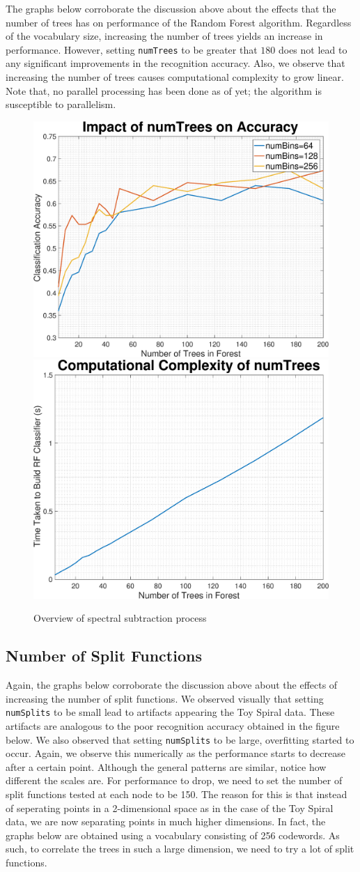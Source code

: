 \documentclass[a4paper,pra,twocolumn,10pt,aps,longbibliography,nobalancelastpage]{revtex4-1}
\begin{document}
The graphs below corroborate the discussion above about the effects that the number of trees has on performance of the Random Forest algorithm. Regardless of the vocabulary size, increasing the number of trees yields an increase in performance. However, setting  \texttt{numTrees} to be greater that $180$ does not lead to any significant improvements in the recognition accuracy. Also, we observe that increasing the number of trees causes computational complexity to grow linear. Note that, no parallel processing has been done as of yet; the algorithm is susceptible to parallelism. 

\begin{figure}[H]
	\centering
    \includegraphics[width=0.49\columnwidth]{numTrees_acc}
	\includegraphics[width=0.49\columnwidth]{numTrees_complexity}
    \caption{Overview of spectral subtraction process}
    \label{fig:numtrees_caltech}
\end{figure}

\subsection*{Number of Split Functions}

Again, the graphs below corroborate the discussion above about the effects of increasing the number of split functions. We observed visually that setting \texttt{numSplits} to be small lead to artifacts appearing the Toy Spiral data. These artifacts are analogous to the poor recognition accuracy obtained in the figure below. We also observed that setting \texttt{numSplits} to be large, overfitting started to occur. Again, we observe this numerically as the performance starts to decrease after a certain point. Although the general patterns are similar, notice how different the scales are. For performance to drop, we need to set the number of split functions tested at each node to be 150. The reason for this is that instead of seperating points in a 2-dimensional space as in the case of the Toy Spiral data, we are now separating points in much higher dimensions. In fact, the graphs below are obtained using a vocabulary consisting of 256 codewords. As such, to correlate the trees in such a large dimension, we need to try a lot of split functions. 
\end{document}
